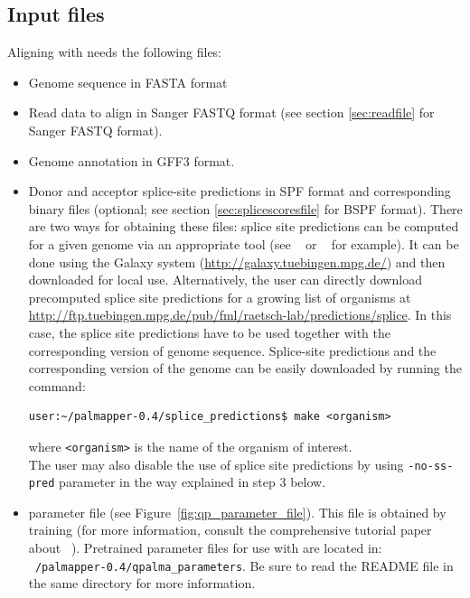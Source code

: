 \documentclass{article}
\begin{document}
\subsection{Input files}
\label{sec:inputfile}
Aligning with \PALMapper{} needs the following files: 
\begin{itemize}
\item Genome sequence in FASTA format
\item Read data to align in Sanger FASTQ format (see section
  \ref{sec:readfile} for Sanger FASTQ format).
\item Genome annotation in GFF3 format.
\item Donor and acceptor splice-site predictions in SPF format and
corresponding binary files (optional; see section
\ref{sec:splicescoresfile} for BSPF format). There are two ways for
obtaining these files: splice site predictions can be computed for a
given genome via an appropriate tool (see
\mGene{}~\cite{Schweikertetal09,Schweikertetal09b} or
\ASP{}~\cite{Sonnenburgetal07} for example). It can be done using the
Galaxy system (\url{http://galaxy.tuebingen.mpg.de/}) and then
downloaded for local use. Alternatively, the user can directly
download precomputed splice site predictions for a growing list of
organisms at
\url{http://ftp.tuebingen.mpg.de/pub/fml/raetsch-lab/predictions/splice}. In
this case, the splice site predictions have to be used together
with the corresponding version of genome sequence. Splice-site
predictions and the corresponding version of the genome can be easily
downloaded by running the command: 
\begin{verbatim}
user:~/palmapper-0.4/splice_predictions$ make <organism>
\end{verbatim}
where \texttt{<organism>} is the name of the organism of interest.\\
The user may also disable the use of splice site predictions by using
\texttt{-no-ss-pred} parameter in the way explained in step 3 below.
\item \QP{} parameter file (see
  Figure~\ref{fig:qp_parameter_file}). This file is obtained by
  training \QP{} (for more information, consult the comprehensive tutorial
  paper about \PALMapper{}~\cite{Palmapper}). Pretrained \QP{}
  parameter files for use with \PALMapper{} are located 
in: \texttt{~/palmapper-0.4/qpalma\_parameters}. Be sure to read the
README file in the same directory for more information.
\end{itemize}
\end{document}
